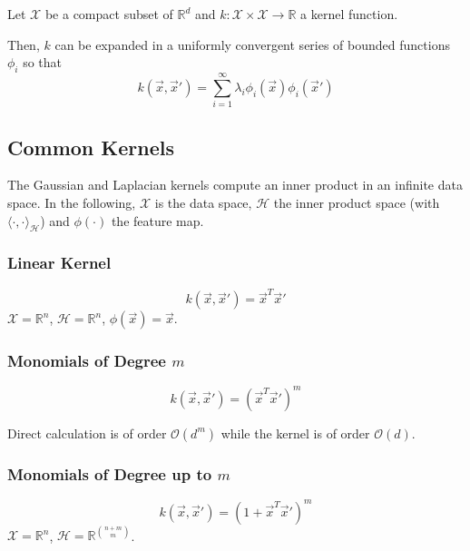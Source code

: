 \begin{theorem}
    Let $\mathcal{X}$ be a compact subset of
    $\mathbb{R}^d$ and
    $k : \mathcal{X} \times \mathcal{X} \to \mathbb{R}$
    a kernel function.
    
    Then, $k$ can be expanded in a uniformly convergent
    series of bounded functions $\phi_i$ so that
    \begin{equation*}
        k(\vec{x}, \vec{x}') =
        \sum_{i=1}^{\infty}{
            \lambda_i \phi_i(\vec{x}) \phi_i(\vec{x}')
        }
    \end{equation*}
\end{theorem}


\subsection{Common Kernels}
The Gaussian and Laplacian kernels compute an inner product
in an infinite data space.
In the following, $\mathcal{X}$ is the data space,
$\mathcal{H}$ the inner product space
(with $\langle \cdot , \cdot \rangle_\mathcal{H}$)
and $\phi(\cdot)$ the feature map.

\subsubsection{Linear Kernel}
\begin{equation*}
    k(\vec{x}, \vec{x}') = \vec{x}^T \vec{x}'
\end{equation*}
$\mathcal{X} = \mathbb{R}^n$,
$\mathcal{H} = \mathbb{R}^n$,
$\phi(\vec{x}) = \vec{x}$.

\subsubsection{Monomials of Degree $m$}
\begin{equation*}
    k(\vec{x}, \vec{x}') = (\vec{x}^T \vec{x}')^m
\end{equation*}

Direct calculation is of order $\mathcal{O}(d^m)$
while the kernel is of order $\mathcal{O}(d)$.

\subsubsection{Monomials of Degree up to $m$}
\begin{equation*}
    k(\vec{x}, \vec{x}') = (1 + \vec{x}^T \vec{x}')^m
\end{equation*}
$\mathcal{X} = \mathbb{R}^n$,
$\mathcal{H} = \mathbb{R}^{\binom{n+m}{m}}$.

